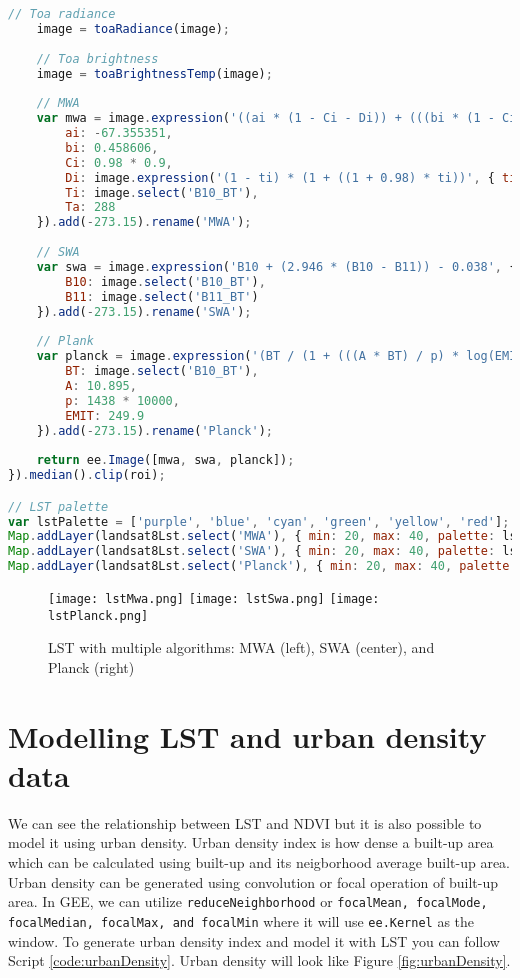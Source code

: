 \begin{lstlisting}[language=JavaScript, label={code:lstProcess}, caption={GEE Script to calculate LST manually}]
	// Toa radiance
	image = toaRadiance(image);
	
	// Toa brightness
	image = toaBrightnessTemp(image);
	
	// MWA
	var mwa = image.expression('((ai * (1 - Ci - Di)) + (((bi * (1 - Ci - Di)) + Ci + Di) * Ti) - (Di * Ta)) / Ci', {
		ai: -67.355351,
		bi: 0.458606,
		Ci: 0.98 * 0.9,
		Di: image.expression('(1 - ti) * (1 + ((1 + 0.98) * ti))', { ti: 0.95 }),
		Ti: image.select('B10_BT'),
		Ta: 288
	}).add(-273.15).rename('MWA');
	
	// SWA
	var swa = image.expression('B10 + (2.946 * (B10 - B11)) - 0.038', {
		B10: image.select('B10_BT'),
		B11: image.select('B11_BT')
	}).add(-273.15).rename('SWA');
	
	// Plank
	var planck = image.expression('(BT / (1 + (((A * BT) / p) * log(EMIT))))', {
		BT: image.select('B10_BT'),
		A: 10.895,
		p: 1438 * 10000,
		EMIT: 249.9
	}).add(-273.15).rename('Planck');
	
	return ee.Image([mwa, swa, planck]);
}).median().clip(roi);

// LST palette
var lstPalette = ['purple', 'blue', 'cyan', 'green', 'yellow', 'red'];
Map.addLayer(landsat8Lst.select('MWA'), { min: 20, max: 40, palette: lstPalette }, 'LST MWA');
Map.addLayer(landsat8Lst.select('SWA'), { min: 20, max: 40, palette: lstPalette }, 'LST SWA');
Map.addLayer(landsat8Lst.select('Planck'), { min: 20, max: 40, palette: lstPalette }, 'LST Planck');
\end{lstlisting}

\begin{figure}
	\label{fig:lstMany}
	\centering
	\texttt{[image: lstMwa.png]}
	\texttt{[image: lstSwa.png]}
	\texttt{[image: lstPlanck.png]}
	\caption{LST with multiple algorithms: MWA (left), SWA (center), and Planck (right)}
\end{figure}

\section{Modelling LST and urban density data}
We can see the relationship between LST and NDVI but it is also possible to model it using urban density. Urban density index is how dense a built-up area which can be calculated using built-up and its neigborhood average built-up area. Urban density can be generated using convolution or focal operation of built-up area. In GEE, we can utilize \verb|reduceNeighborhood| or \verb|focalMean, focalMode, focalMedian, focalMax, and focalMin| where it will use \verb|ee.Kernel| as the window. To generate urban density index and model it with LST you can follow Script \ref{code:urbanDensity}. Urban density will look like Figure \ref{fig:urbanDensity}.

